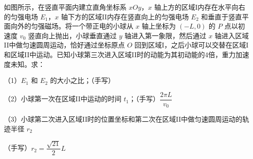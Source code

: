 \begin{problem}[（20分）]
如图所示，在竖直平面内建立直角坐标系 $xOy$，$x$ 轴上方的区域I内存在水平向右的匀强电场 $E_1$，$x$ 轴下方的区域II内存在竖直向上的匀强电场 $E_2$ 和垂直于竖直平面向外的匀强磁场。将一个带正电的小球从 $x$ 轴上坐标为 $(-L,0)$ 的 $P$ 点以初速度 $v_0$ 竖直向上抛出，小球垂直通过 $y$ 轴进入第一象限，然后通过 $x$ 轴进入区域II中做匀速圆周运动，恰好通过坐标原点 $O$ 回到区域I，之后小球可以交替在区域I和区域II中运动。已知小球第三次进入区域II时的动能为其初动能的4倍，重力加速度未知。求：

（1）$E_1$ 和 $E_2$ 的大小之比；\quad （手写）%

（2）小球第一次在区域II中运动的时间 $t_1$；\quad （手写）$\dfrac{2\pi L}{v_0}$

（3）小球第二次进入区域II时的位置坐标和第二次在区域II中做匀速圆周运动的轨迹半径 $r_2$

（手写）$r_2=\dfrac{\sqrt{21}}{2}L$

\end{problem}
